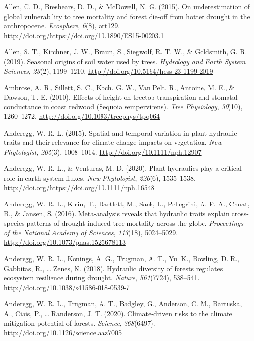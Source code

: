 \documentclass[11pt,twoside]{reedthesis}
\begin{document}
\hypertarget{ref-Allen2015}{}
Allen, C. D., Breshears, D. D., \& McDowell, N. G. (2015). On
underestimation of global vulnerability to tree mortality and forest
die-off from hotter drought in the anthropocene. \emph{Ecosphere},
\emph{6}(8), art129.
\url{http://doi.org/https://doi.org/10.1890/ES15-00203.1}

\hypertarget{ref-Allen2019}{}
Allen, S. T., Kirchner, J. W., Braun, S., Siegwolf, R. T. W., \&
Goldsmith, G. R. (2019). Seasonal origins of soil water used by trees.
\emph{Hydrology and Earth System Sciences}, \emph{23}(2), 1199--1210.
\url{http://doi.org/10.5194/hess-23-1199-2019}

\hypertarget{ref-Ambrose2010}{}
Ambrose, A. R., Sillett, S. C., Koch, G. W., Van Pelt, R., Antoine, M.
E., \& Dawson, T. E. (2010). Effects of height on treetop transpiration
and stomatal conductance in coast redwood (Sequoia sempervirens).
\emph{Tree Physiology}, \emph{30}(10), 1260--1272.
\url{http://doi.org/10.1093/treephys/tpq064}

\hypertarget{ref-anderegg_spatial_2015}{}
Anderegg, W. R. L. (2015). Spatial and temporal variation in plant
hydraulic traits and their relevance for climate change impacts on
vegetation. \emph{New Phytologist}, \emph{205}(3), 1008--1014.
\url{http://doi.org/10.1111/nph.12907}

\hypertarget{ref-AndereggVenturas2020}{}
Anderegg, W. R. L., \& Venturas, M. D. (2020). Plant hydraulics play a
critical role in earth system fluxes. \emph{New Phytologist},
\emph{226}(6), 1535--1538.
\url{http://doi.org/https://doi.org/10.1111/nph.16548}

\hypertarget{ref-anderegg_meta-analysis_2016}{}
Anderegg, W. R. L., Klein, T., Bartlett, M., Sack, L., Pellegrini, A. F.
A., Choat, B., \& Jansen, S. (2016). Meta-analysis reveals that
hydraulic traits explain cross-species patterns of drought-induced tree
mortality across the globe. \emph{Proceedings of the National Academy of
Sciences}, \emph{113}(18), 5024--5029.
\url{http://doi.org/10.1073/pnas.1525678113}

\hypertarget{ref-anderegg_hydraulic_2018}{}
Anderegg, W. R. L., Konings, A. G., Trugman, A. T., Yu, K., Bowling, D.
R., Gabbitas, R., \ldots{} Zenes, N. (2018). Hydraulic diversity of
forests regulates ecosystem resilience during drought. \emph{Nature},
\emph{561}(7724), 538--541.
\url{http://doi.org/10.1038/s41586-018-0539-7}

\hypertarget{ref-Anderegg2020}{}
Anderegg, W. R. L., Trugman, A. T., Badgley, G., Anderson, C. M.,
Bartuska, A., Ciais, P., \ldots{} Randerson, J. T. (2020).
Climate-driven risks to the climate mitigation potential of forests.
\emph{Science}, \emph{368}(6497).
\url{http://doi.org/10.1126/science.aaz7005}
\end{document}
